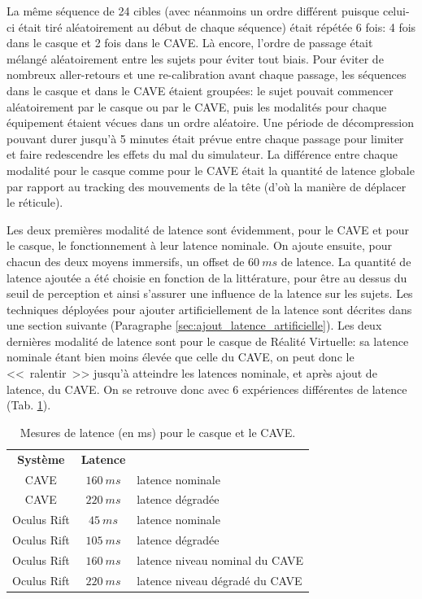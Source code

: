 	\par La même séquence de 24 cibles (avec néanmoins un ordre différent puisque celui-ci était tiré aléatoirement au début de chaque séquence) était répétée 6 fois: 4 fois dans le casque et 2 fois dans le CAVE. Là encore, l'ordre de passage était mélangé aléatoirement entre les sujets pour éviter tout biais. Pour éviter de nombreux aller-retours et une re-calibration avant chaque passage, les séquences dans le casque et dans le CAVE étaient groupées: le sujet pouvait commencer aléatoirement par le casque ou par le CAVE, puis les modalités pour chaque équipement étaient vécues dans un ordre aléatoire. Une période de décompression pouvant durer jusqu'à 5 minutes était prévue entre chaque passage pour limiter et faire redescendre les effets du mal du simulateur. La différence entre chaque modalité pour le casque comme pour le CAVE était la quantité de latence globale par rapport au tracking des mouvements de la tête (d'où la manière de déplacer le réticule).
	
	\par Les deux premières modalité de latence sont évidemment, pour le CAVE et pour le casque, le fonctionnement à leur latence nominale. On ajoute ensuite, pour chacun des deux moyens immersifs, un offset de $60~ms$ de latence. La quantité de latence ajoutée a été choisie en fonction de la littérature, pour être au dessus du seuil de perception et ainsi s'assurer une influence de la latence sur les sujets. Les techniques déployées pour ajouter artificiellement de la latence sont décrites dans une section suivante (Paragraphe \ref{sec:ajout_latence_artificielle}). Les deux dernières modalité de latence sont pour le casque de Réalité Virtuelle: sa latence nominale étant bien moins élevée que celle du CAVE, on peut donc le <<~ralentir~>> jusqu'à atteindre les latences nominale, et après ajout de latence, du CAVE. On se retrouve donc avec 6 expériences différentes de latence (Tab. \ref{tab:latence_casque_cave_expe}).
	
	\begin{table}[h]	
		\centering
		\caption{Mesures de latence (en ms) pour le casque et le CAVE.}
		\label{tab:latence_casque_cave_expe}
		\begin{tabular}{c|c|l}
			\textbf{Système} & \textbf{Latence}\\
			CAVE & $160~ms$ & latence nominale\\
			CAVE & $220~ms$ & latence dégradée\\
			Oculus Rift & $45~ms$ & latence nominale\\
			Oculus Rift & $105~ms$ & latence dégradée\\
			Oculus Rift & $160~ms$ & latence niveau nominal du CAVE\\
			Oculus Rift & $220~ms$ & latence niveau dégradé du CAVE\\
		\end{tabular}
	\end{table}
	

